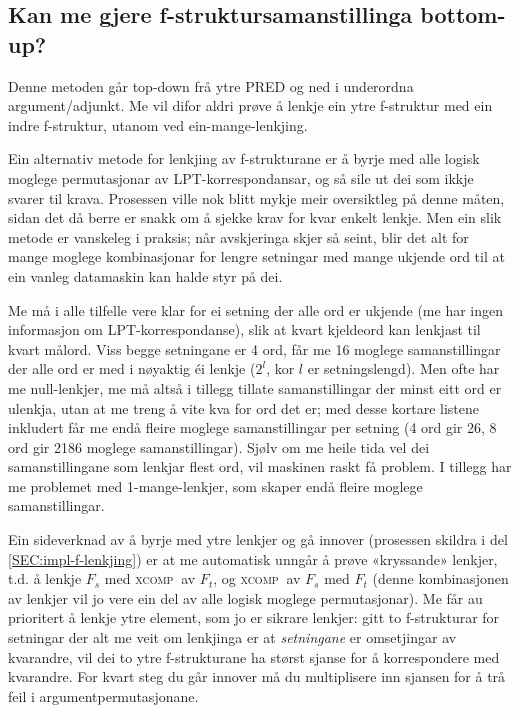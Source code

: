 \documentclass[11pt,a4paper,oneside,draft]{book}
\newcommand{\F}[2]{\textsc{#1}\ensuremath{_{#2}}}
\newcommand{\XCOMPs}{\F{xcomp~}{}}
\begin{document}
\subsection{Kan me gjere f-struktursamanstillinga bottom-up?}
\label{sec-4.1.3}


Denne metoden går top-down frå ytre PRED og ned i underordna
argument/adjunkt. Me vil difor aldri prøve å lenkje ein ytre
f-struktur med ein indre f-struktur, utanom ved ein-mange-lenkjing.

Ein alternativ metode for lenkjing av f-strukturane er å byrje med
alle logisk moglege permutasjonar av LPT-korrespondansar, og så sile
ut dei som ikkje svarer til krava. Prosessen ville nok blitt mykje
meir oversiktleg på denne måten, sidan det då berre er snakk om å
sjekke krav for kvar enkelt lenkje.  Men ein slik metode er vanskeleg
i praksis; når avskjeringa skjer så seint, blir det alt for mange
moglege kombinasjonar for lengre setningar med mange ukjende ord til
at ein vanleg datamaskin kan halde styr på dei.

Me må i alle tilfelle vere klar for ei setning der alle ord er ukjende
(me har ingen informasjon om LPT-korrespondanse), slik at kvart
kjeldeord kan lenkjast til kvart målord. Viss begge setningane er 4 ord,
får me 16 moglege samanstillingar der alle ord er med i nøyaktig éi
lenkje ($2^l$, kor $l$ er setningslengd). Men ofte har me
null-lenkjer, me må altså i tillegg tillate samanstillingar der minst
eitt ord er ulenkja, utan at me treng å vite kva for ord det er; med
desse kortare listene inkludert får me endå fleire moglege
samanstillingar per setning (4 ord gir 26, 8 ord gir 2186 moglege
samanstillingar). Sjølv om me heile tida vel dei samanstillingane som
lenkjar flest ord, vil maskinen raskt få problem. I tillegg har me
problemet med 1-mange-lenkjer, som skaper endå fleire moglege
samanstillingar.

Ein sideverknad av å byrje med ytre lenkjer og gå innover (prosessen
skildra i del \ref{SEC:impl-f-lenkjing}) er at me automatisk unngår å
prøve «kryssande» lenkjer, t.d. å lenkje $F_s$ med \XCOMPs av $F_t$, og
\XCOMPs av $F_s$ med $F_t$ (denne kombinasjonen av lenkjer vil jo vere
ein del av alle logisk moglege permutasjonar). Me får au prioritert å
lenkje ytre element, som jo er sikrare lenkjer: gitt to f-strukturar
for setningar der alt me veit om lenkjinga er at \emph{setningane} er
omsetjingar av kvarandre, vil dei to ytre f-strukturane ha størst
sjanse for å korrespondere med kvarandre. For kvart steg du går
innover må du multiplisere inn sjansen for å trå feil i
argumentpermutasjonane.
\end{document}
